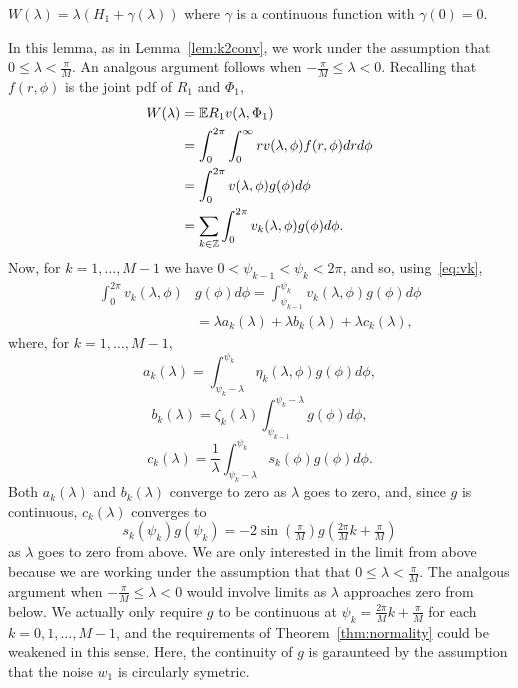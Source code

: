 \documentclass[journal]{IEEEtran}
\begin{document}
\begin{lemma}\label{lem:expRvlamphi}
$W(\lambda) =  \lambda(H_1 + \gamma(\lambda))$ where $\gamma$ is a continuous function with $\gamma(0) = 0$.
\end{lemma}
\begin{IEEEproof}
In this lemma, as in Lemma~\ref{lem:k2conv}, we work under the assumption that $0 \leq \lambda < \frac{\pi}{M}$.  An analgous argument follows when $-\tfrac{\pi}{M} \leq \lambda < 0$.  Recalling that $f(r,\phi)$ is the joint pdf of $R_1$ and $\Phi_1$, 
\begin{align}
W(\lambda) &= {\mathbb E} R_1 v(\lambda, \Phi_1) \nonumber  \\
&= \int_0^{2\pi}\int_{0}^\infty r v(\lambda, \phi) f(r,\phi) dr d\phi \nonumber  \\ 
&= \int_0^{2\pi} v(\lambda, \phi) g(\phi) d\phi \nonumber \\
&= \sum_{k \in {\mathbb Z}} \int_0^{2\pi} v_k(\lambda, \phi) g(\phi) d\phi. \label{eq:Winfsum}
\end{align}
Now, for $k = 1, \dots, M-1$ we have $0 < \psi_{k-1} < \psi_k < 2\pi$, and so, using~\eqref{eq:vk},
\begin{align*}
\int_0^{2\pi} v_k(\lambda, \phi) &g(\phi) d\phi = \int_{\psi_{k-1}}^{\psi_{k}} v_k(\lambda, \phi) g(\phi) d\phi \\
&= \lambda a_k(\lambda) + \lambda b_k(\lambda) + \lambda c_k(\lambda),
\end{align*}
where, for $k = 1, \dots, M-1$,
\begin{equation}\label{eq:ak}
a_k(\lambda) = \int_{\psi_k-\lambda}^{\psi_k}\eta_k(\lambda, \phi) g(\phi) d\phi,
\end{equation}
\[
b_k(\lambda) = \zeta_k(\lambda) \int_{\psi_{k-1}}^{\psi_k -\lambda}g(\phi) d\phi,
\]
\begin{equation}\label{eq:ck}
c_k(\lambda) = \frac{1}{\lambda} \int_{\psi_{k} - \lambda}^{\psi_{k}} s_k(\phi) g(\phi) d\phi.
\end{equation}
Both $a_k(\lambda)$ and $b_k(\lambda)$ converge to zero as $\lambda$ goes to zero, and, since $g$ is continuous, $c_k(\lambda)$ converges to 
\[
s_k(\psi_k)g(\psi_k) = -2\sin(\tfrac{\pi}{M}) g(\tfrac{2\pi}{M}k + \tfrac{\pi}{M})
\]
as $\lambda$ goes to zero from above.  We are only interested in the limit from above because we are working under the assumption that that $0 \leq \lambda < \frac{\pi}{M}$.  The analgous argument when $-\tfrac{\pi}{M} \leq \lambda < 0$ would involve limits as $\lambda$ approaches zero from below.  We actually only require $g$ to be continuous at $\psi_k = \tfrac{2\pi}{M}k + \tfrac{\pi}{M}$ for each $k = 0, 1, \dots, M-1$, and the requirements of Theorem~\ref{thm:normality} could be weakened in this sense.  Here, the continuity of $g$ is garaunteed by the assumption that the noise $w_1$ is circularly symetric.


\end{IEEEproof}
\end{document}
